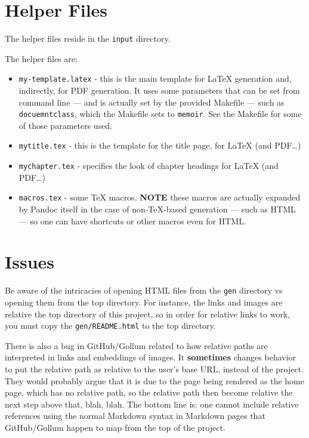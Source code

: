 \documentclass[oneside,]{memoir}
\begin{document}
\section{Helper Files}

The helper files reside in the \texttt{input} directory.

The helper files are:

\begin{itemize}
\item
  \texttt{my-template.latex} - this is the main template for LaTeX
  generation and, indirectly, for PDF generation. It uses some
  parameters that can be set from command line --- and is actually set
  by the provided Makefile --- such as \texttt{docuemntclass}, which the
  Makefile sets to \texttt{memoir}. See the Makefile for some of those
  parameters used.
\item
  \texttt{mytitle.tex} - this is the template for the title page, for
  LaTeX (and PDF\ldots{})
\item
  \texttt{mychapter.tex} - specifies the look of chapter headings for
  LaTeX (and PDF\ldots{})
\item
  \texttt{macros.tex} - some TeX macros. \textbf{NOTE} these macros are
  actually expanded by Pandoc itself in the case of non-TeX-based
  generation --- such as HTML --- so one can have shortcuts or other
  macros even for HTML.
\end{itemize}
\section{Issues}

Be aware of the intricacies of opening HTML files from the \texttt{gen}
directory vs opening them from the top directory. For instance, the
links and images are relative the top directory of this project, so in
order for relative links to work, you must copy the
\texttt{gen/README.html} to the top directory.

There is also a bug in GitHub/Gollum related to how relative paths are
interpreted in links and embeddings of images. It \textbf{sometimes}
changes behavior to put the relative path as relative to the user's base
URL, instead of the project. They would probably argue that it is due to
the page being rendered as the home page, which has no relative path, so
the relative path then become relative the next step above that, blah,
blah. The bottom line is: one cannot include relative references using
the normal Markdown syntax in Markdown pages that GitHub/Gollum happen
to map from the top of the project.
\end{document}
